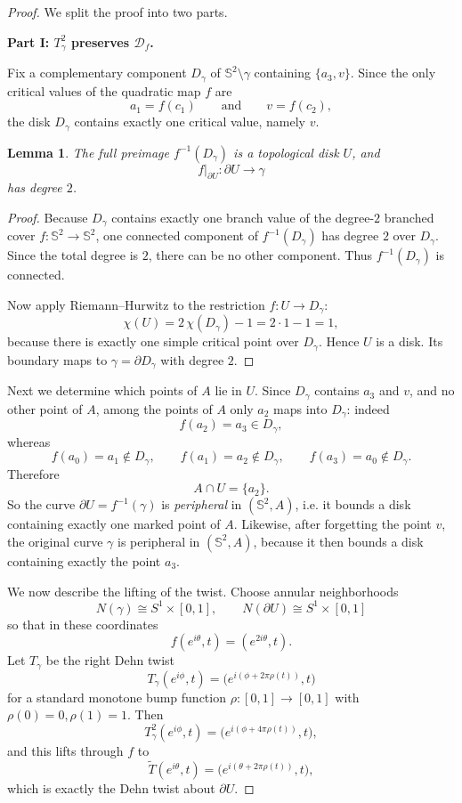 \documentclass[11pt]{article}
\newtheorem{lemma}[theorem]{Lemma}
\theoremstyle{remark}
\newcommand{\Dsp}{\mathcal D_f}
\begin{document}
\begin{proof}
We split the proof into two parts.

\medskip
\noindent
\textbf{Part I: \(T_\gamma^2\) preserves \(\Dsp\).}

Fix a complementary component \(D_\gamma\) of \(\mathbb S^2\setminus \gamma\) containing
\(\{a_3,v\}\). Since the only critical values of the quadratic map \(f\) are
\[
a_1=f(c_1)\qquad\text{and}\qquad v=f(c_2),
\]
the disk \(D_\gamma\) contains exactly one critical value, namely \(v\).

\begin{lemma}\label{lem:preimage-disk}
The full preimage \(f^{-1}(D_\gamma)\) is a topological disk \(U\), and
\[
f|_{\partial U}:\partial U\to \gamma
\]
has degree \(2\).
\end{lemma}

\begin{proof}
Because \(D_\gamma\) contains exactly one branch value of the degree-$2$ branched cover
\(f:\mathbb S^2\to\mathbb S^2\), one connected component of \(f^{-1}(D_\gamma)\) has degree
\(2\) over \(D_\gamma\). Since the total degree is \(2\), there can be no other component.
Thus \(f^{-1}(D_\gamma)\) is connected.

Now apply Riemann--Hurwitz to the restriction \(f:U\to D_\gamma\):
\[
\chi(U)=2\,\chi(D_\gamma)-1=2\cdot 1-1=1,
\]
because there is exactly one simple critical point over \(D_\gamma\). Hence \(U\) is a disk.
Its boundary maps to \(\gamma=\partial D_\gamma\) with degree \(2\).
\end{proof}

Next we determine which points of \(A\) lie in \(U\). Since \(D_\gamma\) contains \(a_3\) and
\(v\), and no other point of \(A\), among the points of \(A\) only \(a_2\) maps into \(D_\gamma\):
indeed
\[
f(a_2)=a_3\in D_\gamma,
\]
whereas
\[
f(a_0)=a_1\notin D_\gamma,\qquad f(a_1)=a_2\notin D_\gamma,\qquad f(a_3)=a_0\notin D_\gamma.
\]
Therefore
\[
A\cap U=\{a_2\}.
\]
So the curve \(\partial U=f^{-1}(\gamma)\) is \emph{peripheral} in \((\mathbb S^2,A)\), i.e.
it bounds a disk containing exactly one marked point of \(A\). Likewise, after forgetting
the point \(v\), the original curve \(\gamma\) is peripheral in \((\mathbb S^2,A)\), because
it then bounds a disk containing exactly the point \(a_3\).

We now describe the lifting of the twist. Choose annular neighborhoods
\[
N(\gamma)\cong S^1\times[0,1],\qquad N(\partial U)\cong S^1\times[0,1]
\]
so that in these coordinates
\[
f(e^{i\theta},t)=(e^{2i\theta},t).
\]
Let \(T_\gamma\) be the right Dehn twist
\[
T_\gamma(e^{i\phi},t)=\bigl(e^{i(\phi+2\pi \rho(t))},t\bigr)
\]
for a standard monotone bump function \(\rho:[0,1]\to[0,1]\) with
\(\rho(0)=0,\rho(1)=1\). Then
\[
T_\gamma^2(e^{i\phi},t)=\bigl(e^{i(\phi+4\pi \rho(t))},t\bigr),
\]
and this lifts through \(f\) to
\[
\widetilde T(e^{i\theta},t)=\bigl(e^{i(\theta+2\pi \rho(t))},t\bigr),
\]
which is exactly the Dehn twist about \(\partial U\).


\end{proof}
\end{document}
